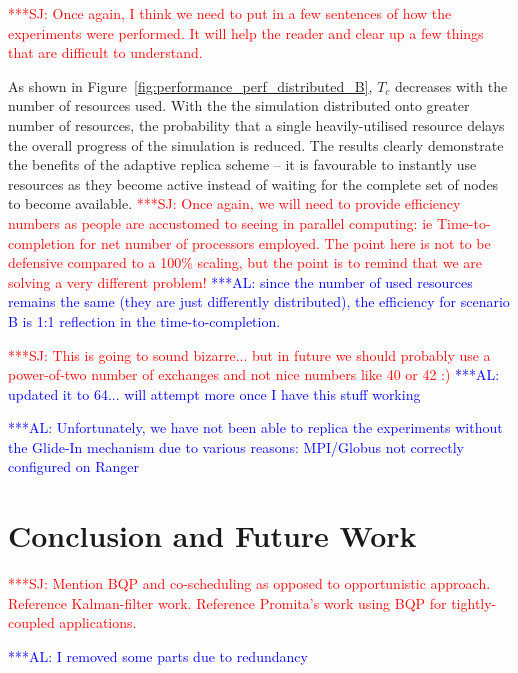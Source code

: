 \documentclass{rspublic}
\newcommand{\alnote}[1]{ {\textcolor{blue} { ***AL: #1 }}}
\newcommand{\jhanote}[1]{ {\textcolor{red} { ***SJ: #1 }}}
\newcommand{\alnote}[1]{}
\newcommand{\jhanote}[1]{}
\begin{document}
\jhanote{Once again, I think we need to put in a few sentences of how
  the experiments were performed. It will help the reader and clear up
  a few things that are difficult to understand.}

As shown in Figure~\ref{fig:performance_perf_distributed_B}, $T_{c}$
decreases with the number of resources used.  With the the simulation
distributed onto greater number of resources, the probability that a
single heavily-utilised resource delays the overall progress of the
simulation is reduced.
The results clearly demonstrate the benefits of the adaptive replica
scheme -- it is favourable to instantly use resources as they become
active instead of waiting for the complete set of nodes to become
available.  \jhanote{Once again, we will need to provide efficiency
  numbers as people are accustomed to seeing in parallel computing: ie
  Time-to-completion for net number of processors employed.  The point
  here is not to be defensive compared to a 100\% scaling, but the
  point is to remind that we are solving a very different problem!}
\alnote{since the number of used resources remains the same (they are
  just differently distributed), the efficiency for scenario B is 1:1
  reflection in the time-to-completion.}


\jhanote{This is going to sound bizarre... but in future we should
  probably use a power-of-two number of exchanges and not nice numbers
  like 40 or 42 :)}           
\alnote{updated it to 64... will attempt more once I have this stuff working}

                                      
\alnote{Unfortunately, we have not been able to replica the
  experiments without the Glide-In mechanism due to various reasons:
  MPI/Globus not correctly configured on Ranger}


\section{Conclusion and Future Work}

\jhanote{Mention BQP and co-scheduling as opposed to opportunistic
  approach. Reference Kalman-filter work. Reference Promita's work
  using BQP for tightly-coupled applications.} 
                
\alnote{I removed some parts due to redundancy}
\end{document}
